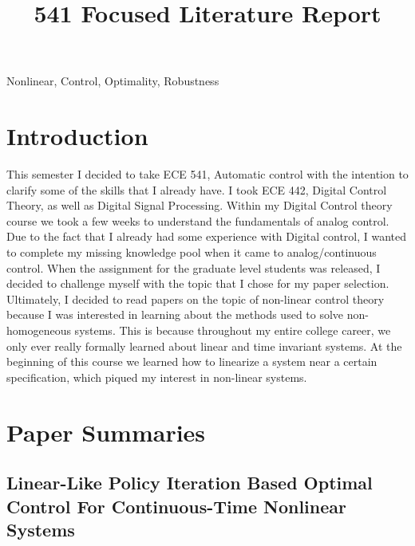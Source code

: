\documentclass{IEEEtran}
\begin{document}
\title{541 Focused Literature Report}

\author{
}

\maketitle


\begin{IEEEkeywords}
  Nonlinear, Control, Optimality, Robustness
\end{IEEEkeywords}





\section{Introduction}
This semester I decided to take ECE 541, Automatic control with the intention to clarify some of the skills that I already have. I took ECE 442, Digital Control Theory, as well as Digital Signal Processing. Within my Digital Control theory course we took a few weeks to understand the fundamentals of analog control. Due to the fact that I already had some experience with Digital control, I wanted to complete my missing knowledge pool when it came to analog/continuous control. When the assignment for the graduate level students was released, I decided to challenge myself with the topic that I chose for my paper selection. Ultimately, I decided to read papers on the topic of non-linear control theory because I was interested in learning about the methods used to solve non-homogeneous systems. This is because throughout my entire college career, we only ever really formally learned about linear and time invariant systems. At the beginning of this course we learned how to linearize a system near a certain specification, which piqued my interest in non-linear systems.

\section{Paper Summaries}

\subsection{Linear-Like Policy Iteration Based Optimal Control For Continuous-Time Nonlinear Systems}
\end{document}
